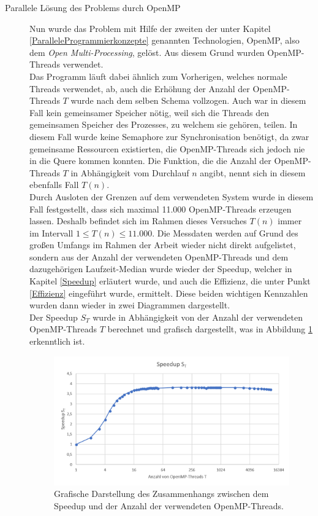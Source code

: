 \begin{description}
					\item[Parallele Lösung des Problems durch OpenMP]
					
						Nun wurde das Problem mit Hilfe der zweiten der unter Kapitel \ref{ParalleleProgrammierkonzepte} genannten Technologien, OpenMP, also dem \textit{Open Multi-Processing}, gelöst. Aus diesem Grund wurden OpenMP-Threads verwendet.\\
						Das Programm läuft dabei ähnlich zum Vorherigen, welches normale Threads verwendet, ab, auch die Erhöhung der Anzahl der OpenMP-Threads $T$ wurde nach dem selben Schema vollzogen. Auch war in diesem Fall kein gemeinsamer Speicher nötig, weil sich die Threads den gemeinsamen Speicher des Prozesses, zu welchem sie gehören, teilen. In diesem Fall wurde keine Semaphore zur Synchronisation benötigt, da zwar gemeinsame Ressourcen existierten, die OpenMP-Threads sich jedoch nie in die Quere kommen konnten. Die Funktion, die die Anzahl der OpenMP-Threads $T$ in Abhängigkeit vom Durchlauf $n$ angibt, nennt sich in diesem ebenfalls Fall $T(n)$.\\
						Durch Ausloten der Grenzen auf dem verwendeten System wurde in diesem Fall festgestellt, dass sich maximal 11.000 OpenMP-Threads erzeugen lassen. Deshalb befindet sich im Rahmen dieses Versuches $T(n)$ immer im Intervall $1 \leq T(n) \leq 11.000$.
						Die Messdaten werden auf Grund des großen Umfangs im Rahmen der Arbeit wieder nicht direkt aufgelistet, sondern aus der Anzahl der verwendeten OpenMP-Threads und dem dazugehörigen Laufzeit-Median wurde wieder der Speedup, welcher in Kapitel \ref{Speedup} erläutert wurde, und auch die Effizienz, die unter Punkt \ref{Effizienz} eingeführt wurde, ermittelt. Diese beiden wichtigen Kennzahlen wurden dann wieder in zwei Diagrammen dargestellt.\\
						Der Speedup $S_T$ wurde in Abhängigkeit von der Anzahl der verwendeten OpenMP-Threads $T$ berechnet und grafisch dargestellt, was in Abbildung \ref{fig:Speedup_OpenMP} erkenntlich ist.
						
						\begin{figure}
							\centering	
							\includegraphics[width=11cm]{Abbildungen/Speedup_OpenMP.png}
							\caption{Grafische Darstellung des Zusammenhangs zwischen dem Speedup und der Anzahl der verwendeten OpenMP-Threads.}
							\label{fig:Speedup_OpenMP}
						\end{figure}
						

\end{description}
